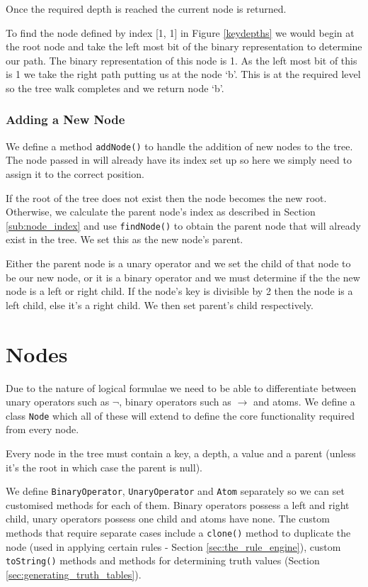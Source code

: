 \documentclass{report}
\begin{document}
Once the required depth is reached the current node is returned.

To find the node defined by index [1, 1] in Figure \ref{keydepths} we would begin at the root node and take the left most bit of the binary representation to determine our path. The binary representation of this node is 1. As the left most bit of this is 1 we take the right path putting us at the node `b'. This is at the required level so the tree walk completes and we return node `b'.

\subsubsection{Adding a New Node}

We define a method {\tt addNode()} to handle the addition of new nodes to the tree. The node passed in will already have its index set up so here we simply need to assign it to the correct position.

If the root of the tree does not exist then the node becomes the new root. Otherwise, we calculate the parent node's index as described in Section \ref{sub:node_index} and use {\tt findNode()} to obtain the parent node that will already exist in the tree. We set this as the new node's parent.

Either the parent node is a unary operator and we set the child of that node to be our new node, or it is a binary operator and we must determine if the the new node is a left or right child. If the node's key is divisible by 2 then the node is a left child, else it's a right child. We then set parent's child respectively. 

\section{Nodes}

Due to the nature of logical formulae we need to be able to differentiate between unary operators such as $\lnot$, binary operators such as $\to$ and atoms. We define a class {\tt Node} which all of these will extend to define the core functionality required from every node.

Every node in the tree must contain a key, a depth, a value and a parent (unless it's the root in which case the parent is null).

We define {\tt BinaryOperator}, {\tt UnaryOperator} and {\tt Atom} separately so we can set customised methods for each of them. Binary operators possess a left and right child, unary operators possess one child and atoms have none. The custom methods that require separate cases include a {\tt clone()} method to duplicate the node (used in applying certain rules - Section \ref{sec:the_rule_engine}), custom {\tt toString()} methods and methods for determining truth values (Section \ref{sec:generating_truth_tables}).
\end{document}
